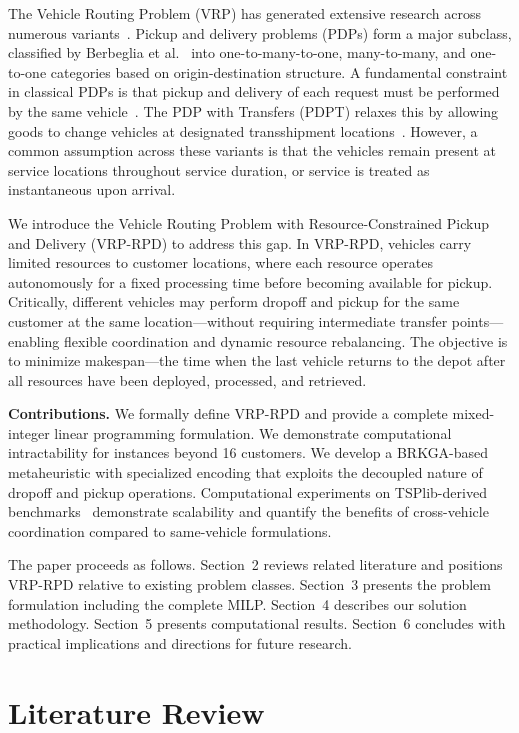 \documentclass[sigconf]{acmart}
\begin{document}
The Vehicle Routing Problem (VRP) has generated extensive research across numerous variants~\cite{toth2014vehicle}. Pickup and delivery problems (PDPs) form a major subclass, classified by Berbeglia et al.~\cite{berbeglia2007static} into one-to-many-to-one, many-to-many, and one-to-one categories based on origin-destination structure. A fundamental constraint in classical PDPs is that pickup and delivery of each request must be performed by the same vehicle~\cite{parragh2010variable}. The PDP with Transfers (PDPT) relaxes this by allowing goods to change vehicles at designated transshipment locations~\cite{masson2013pdpt}. However, a common assumption across these variants is that the vehicles remain present at service locations throughout service duration, or service is treated as instantaneous upon arrival.

We introduce the Vehicle Routing Problem with Resource-Constrained Pickup and Delivery (VRP-RPD) to address this gap. In VRP-RPD, vehicles carry limited resources to customer locations, where each resource operates autonomously for a fixed processing time before becoming available for pickup. Critically, different vehicles may perform dropoff and pickup for the same customer at the same location---without requiring intermediate transfer points---enabling flexible coordination and dynamic resource rebalancing. The objective is to minimize makespan---the time when the last vehicle returns to the depot after all resources have been deployed, processed, and retrieved.

\textbf{Contributions.} We formally define VRP-RPD and provide a complete mixed-integer linear programming formulation. We demonstrate computational intractability for instances beyond 16 customers. We develop a BRKGA-based metaheuristic with specialized encoding that exploits the decoupled nature of dropoff and pickup operations. Computational experiments on TSPlib-derived benchmarks~\cite{reinelt1991tsplib} demonstrate scalability and quantify the benefits of cross-vehicle coordination compared to same-vehicle formulations.

The paper proceeds as follows. Section~2 reviews related literature and positions VRP-RPD relative to existing problem classes. Section~3 presents the problem formulation including the complete MILP. Section~4 describes our solution methodology. Section~5 presents computational results. Section~6 concludes with practical implications and directions for future research.

\section{Literature Review}
\end{document}
